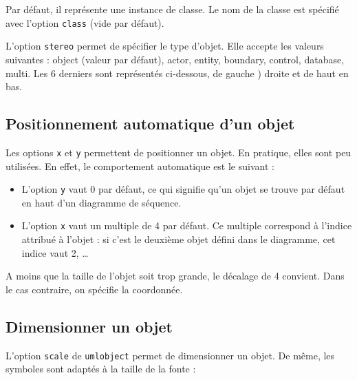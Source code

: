 \documentclass[a4paper,11pt]{report}
\newcommand{\inputTikZ}[1]{%
  }%
\newcommand{\inputTikZ}[1]{%
    \texttt{[image: fig/\#1.pdf]}%
  }%
\begin{document}
\medskip

Par défaut, il représente une instance de classe. Le nom de la classe est spécifié avec l'option {\tt class} (vide par défaut). 

\medskip

L'option {\tt stereo} permet de spécifier le type d'objet. Elle accepte les valeurs suivantes : object (valeur par défaut), actor, entity, boundary, control, database, multi. Les 6 derniers sont représentés ci-dessous, de gauche ) droite et de haut en bas.

\medskip

\begin{minipage}{0.5\textwidth}

\end{minipage}
\begin{minipage}{0.5\textwidth}
\begin{center}
\inputTikZ{objectstereo}
\end{center}
\end{minipage}

\subsection{Positionnement automatique d'un objet}\label{ss.objpos}

Les options {\tt x} et {\tt y} permettent de positionner un objet. En pratique, elles sont peu utilisées. En effet, le comportement automatique est le suivant :

\begin{itemize}
\item L'option {\tt y} vaut 0 par défaut, ce qui signifie qu'un objet se trouve par défaut en haut d'un diagramme de séquence.
\item L'option {\tt x} vaut un multiple de 4 par défaut. Ce multiple correspond à l'indice attribué à l'objet : si c'est le deuxième objet défini dans le diagramme, cet indice vaut 2, \ldots
\end{itemize}

A moins que la taille de l'objet soit trop grande, le décalage de 4 convient. Dans le cas contraire, on spécifie la coordonnée.

\subsection{Dimensionner un objet}\label{ss.objdim}

L'option {\tt scale} de {\tt umlobject} permet de dimensionner un objet. De même, les symboles sont adaptés à la taille de la fonte :
\end{document}
